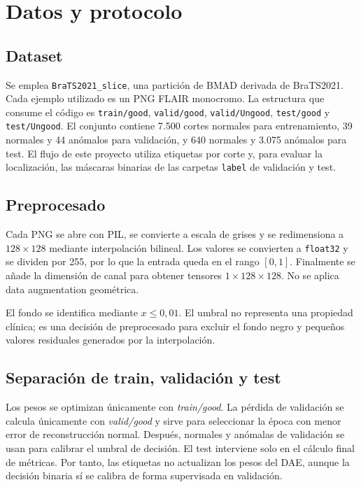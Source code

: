 \documentclass[10pt,a4paper,twocolumn]{article}
\begin{document}
\section{Datos y protocolo}

\subsection{Dataset}
Se emplea \texttt{BraTS2021\_slice}, una partición de BMAD derivada de
BraTS2021. Cada ejemplo utilizado es un PNG FLAIR monocromo. La estructura que
consume el código es \texttt{train/good}, \texttt{valid/good},
\texttt{valid/Ungood}, \texttt{test/good} y \texttt{test/Ungood}. El conjunto
contiene 7.500 cortes normales para entrenamiento, 39 normales y 44 anómalos
para validación, y 640 normales y 3.075 anómalos para test. El flujo de este
proyecto utiliza etiquetas por corte y, para evaluar la localización, las
máscaras binarias de las carpetas \texttt{label} de validación y test.

\subsection{Preprocesado}
Cada PNG se abre con PIL, se convierte a escala de grises y se redimensiona a
$128\times128$ mediante interpolación bilineal. Los valores se convierten a
\texttt{float32} y se dividen por 255, por lo que la entrada queda en el rango
$[0,1]$. Finalmente se añade la dimensión de canal para obtener tensores
$1\times128\times128$. No se aplica data augmentation geométrica.

El fondo se identifica mediante $x\leq0{,}01$. El umbral no representa una
propiedad clínica; es una decisión de preprocesado para excluir el fondo negro y
pequeños valores residuales generados por la interpolación.

\subsection{Separación de train, validación y test}
Los pesos se optimizan únicamente con \emph{train/good}. La pérdida de
validación se calcula únicamente con \emph{valid/good} y sirve para seleccionar
la época con menor error de reconstrucción normal. Después, normales y anómalas
de validación se usan para calibrar el umbral de decisión. El test interviene
solo en el cálculo final de métricas. Por tanto, las etiquetas no actualizan los
pesos del DAE, aunque la decisión binaria sí se calibra de forma supervisada en
validación.
\end{document}
